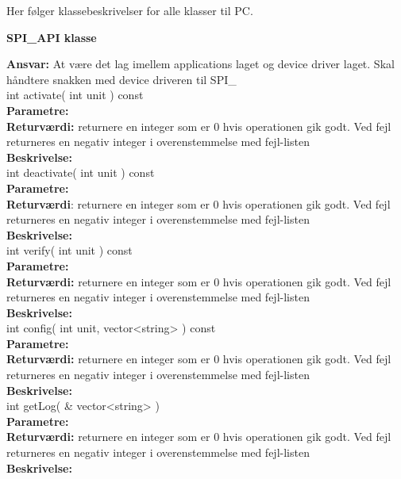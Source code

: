 
Her følger klassebeskrivelser for alle klasser til PC. \\

{\centering
\textbf{SPI_API klasse}\par
}
\textbf{Ansvar:} At være det lag imellem applications laget og device driver laget. Skal håndtere snakken med device driveren til SPI\_ \\

int activate( int unit ) const \\
\textbf{Parametre:}  \\
\textbf{Returværdi:} returnere en integer som er 0 hvis operationen gik godt. Ved fejl returneres en negativ integer i overenstemmelse med fejl-listen \\
\textbf{Beskrivelse:} \\

int deactivate( int unit ) const \\
\textbf{Parametre:}  \\
\textbf{Returværdi}: returnere en integer som er 0 hvis operationen gik godt. Ved fejl returneres en negativ integer i overenstemmelse med fejl-listen  \\
\textbf{Beskrivelse:} \\

int verify( int unit ) const \\
\textbf{Parametre:}  \\
\textbf{Returværdi:} returnere en integer som er 0 hvis operationen gik godt. Ved fejl returneres en negativ integer i overenstemmelse med fejl-listen  \\
\textbf{Beskrivelse:} \\

int config( int unit, vector<string> ) const \\
\textbf{Parametre:}  \\
\textbf{Returværdi:} returnere en integer som er 0 hvis operationen gik godt. Ved fejl returneres en negativ integer i overenstemmelse med fejl-listen  \\
\textbf{Beskrivelse:} \\

int getLog( & vector<string>  ) \\
\textbf{Parametre:}  \\
\textbf{Returværdi:} returnere en integer som er 0 hvis operationen gik godt. Ved fejl returneres en negativ integer i overenstemmelse med fejl-listen  \\
\textbf{Beskrivelse:} \\









